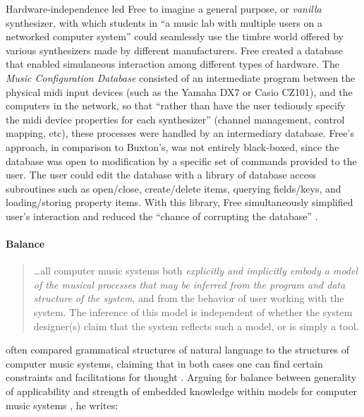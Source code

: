 	Hardware-independence led Free to imagine a general purpose, or \textit{vanilla} synthesizer, with which students in ``a music lab with multiple users on a networked computer system'' \parencite[127]{DBLP:conf/icmc/FreeV88} could seamlessly use the timbre world offered by various synthesizers made by different manufacturers. Free created a database that enabled simulaneous interaction among different types of hardware. The \textit{Music Configuration Database} consisted of an intermediate program between the physical \gls{midi} input devices (such as the Yamaha DX7 or Casio CZ101), and the computers in the network, so that ``rather than have the user tediously specify the \gls{midi} device properties for each synthesizer'' \parencite[133]{DBLP:conf/icmc/FreeV88} (channel management, control mapping, etc), these processes were handled by an intermediary database. Free's approach, in comparison to Buxton's, was not entirely black-boxed, since the database was open to modification by a specific set of commands provided to the user. The user could edit the database with a library of database access subroutines such as open/close, create/delete items, querying fields/keys, and loading/storing property items. With this library, Free simultaneously simplified user's interaction and reduced the ``chance of corrupting the database'' \parencite[137]{DBLP:conf/icmc/FreeV88}. 

	\paragraph{Balance}
	\label{computer:balance}


	\begin{quote}
		\dots all computer music systems both \textit{explicitly and implicitly embody a model of the musical processes that may be inferred from the program and data structure of the system}, and from the behavior of user working with the system. The inference of this model is independent of whether the system designer(s) claim that the system reflects such a model, or is simply a tool. \im \parencite[230-231]{Tru76:ACo}
	\end{quote}

	\textcites{Tru73:The}{Tru76:ACo}{Tru80:The}[Chapter~8]{Emm86:The} often compared grammatical structures of natural language to the structures of computer music systems, claiming that in both cases one can find certain constraints and facilitations for thought \parencite[156]{Emm86:The}. Arguing for balance between generality of applicability and strength of embedded knowledge within models for computer music systems , he writes:

